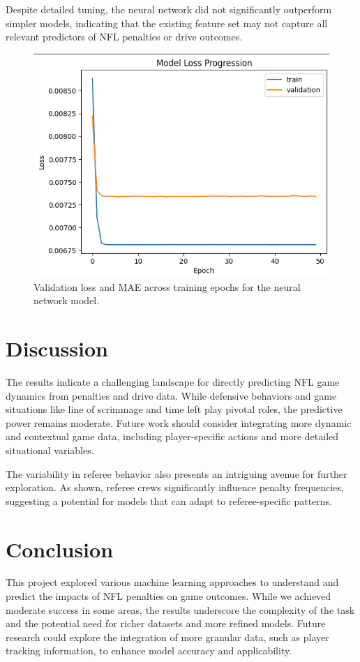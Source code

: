 \documentclass[sigconf, nonacm]{acmart}
\begin{document}
Despite detailed tuning, the neural network did not significantly outperform simpler models, indicating that the existing feature set may not capture all relevant predictors of NFL penalties or drive outcomes.

\begin{figure}[h]
  \centering
  \includegraphics[width=\linewidth]{images/nn_performance.png}
  \caption{Validation loss and MAE across training epochs for the neural network model.}
\end{figure}

\section{Discussion}

The results indicate a challenging landscape for directly predicting NFL game dynamics from penalties and drive data. While defensive behaviors and game situations like line of scrimmage and time left play pivotal roles, the predictive power remains moderate. Future work should consider integrating more dynamic and contextual game data, including player-specific actions and more detailed situational variables.

The variability in referee behavior also presents an intriguing avenue for further exploration. As shown, referee crews significantly influence penalty frequencies, suggesting a potential for models that can adapt to referee-specific patterns.

\section{Conclusion}

This project explored various machine learning approaches to understand and predict the impacts of NFL penalties on game outcomes. While we achieved moderate success in some areas, the results underscore the complexity of the task and the potential need for richer datasets and more refined models. Future research could explore the integration of more granular data, such as player tracking information, to enhance model accuracy and applicability.



\end{document}
